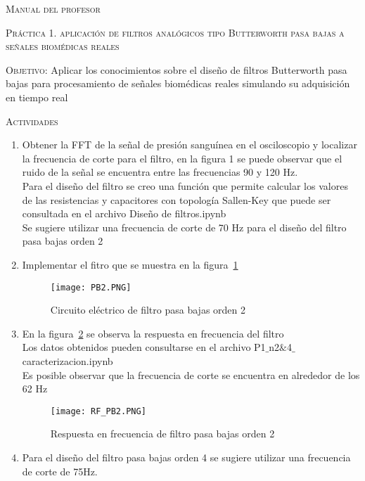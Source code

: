 \documentclass[10pt,letterpaper,spanish,twoside]{report}
\begin{document}
\docdate

\begin{center}
 \textsc{\asignatura}\vspace{.2em}
\end{center}

\textsc{Manual del profesor}

\textsc{Práctica 1. aplicación de filtros analógicos tipo Butterworth pasa bajas a señales biomédicas reales}

\textsc{Objetivo:} Aplicar los conocimientos sobre el diseño de filtros Butterworth pasa bajas para procesamiento de señales biomédicas reales simulando su adquisición en tiempo real

\textsc{Actividades}
\begin{enumerate}
 \item Obtener la FFT de la señal de presión sanguínea en el osciloscopio y localizar la frecuencia de corte para el filtro, en la figura 1 se puede observar que el ruido de la señal se encuentra entre las frecuencias 90 y 120 Hz.
 \\Para el diseño del filtro se creo una función que permite calcular los valores de las resistencias y capacitores con topología Sallen-Key que puede ser consultada en el archivo Diseño de filtros.ipynb\\ Se sugiere utilizar una frecuencia de corte de 70 Hz para el diseño del filtro pasa bajas orden 2
 \item Implementar el fitro que se muestra en la figura~\ref{contexto:PB2}
 \begin{figure}[H]
 	\centering
 	\texttt{[image: PB2.PNG]}
 	\caption{Circuito eléctrico de filtro pasa bajas orden 2}
	\label{contexto:PB2}
 \end{figure}
 \item En la figura~\ref{contexto:RF_2} se observa la respuesta en frecuencia del filtro
 \\Los datos obtenidos pueden consultarse en el archivo P1$\_$n2$\&$4$\_$caracterizacion.ipynb \\Es posible observar que la frecuencia de corte se encuentra en alrededor de los 62 Hz 
  \begin{figure}[H]
 	\centering
 	\texttt{[image: RF\_PB2.PNG]}
 	\caption{Respuesta en frecuencia de filtro pasa bajas orden 2}
	\label{contexto:RF_2}
 \end{figure}
 \item Para el diseño del filtro pasa bajas orden 4 se sugiere utilizar una frecuencia de corte de 75Hz.

\end{enumerate}
\end{document}
